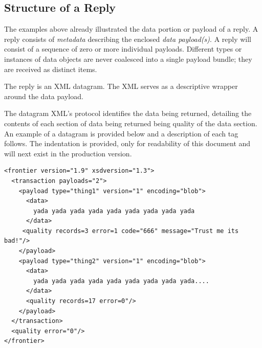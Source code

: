 \subsection{Structure of a Reply}

The examples above already illustrated the data portion or payload of a reply.
A reply consists of \emph{metadata} describing the enclosed
\emph{data payload(s)}.
A reply will consist of a sequence of zero or more individual payloads.
Different types or instances of data objects are never coalesced into a single
payload bundle; they are received as distinct items.

The reply is an XML datagram.  The XML serves as a descriptive wrapper
around the data payload.

The datagram XML's protocol identifies the data being returned, detailing the contents 
of each section of data being returned being quality of the data section. An example of a 
datagram is provided below and a description of each tag follows. The indentation is provided, only
for readability of this document and will next exist in the production version.

\begin{verbatim}
<frontier version="1.9" xsdversion="1.3">
  <transaction payloads="2">
    <payload type="thing1" version="1" encoding="blob">
      <data>
        yada yada yada yada yada yada yada yada yada
      </data>
     <quality records=3 error=1 code="666" message="Trust me its bad!"/>
    </payload>
    <payload type="thing2" version="1" encoding="blob">
      <data>
        yada yada yada yada yada yada yada yada yada....
      </data>
      <quality records=17 error=0"/>
    </payload>
  </transaction>
  <quality error="0"/>
</frontier>
\end{verbatim}


